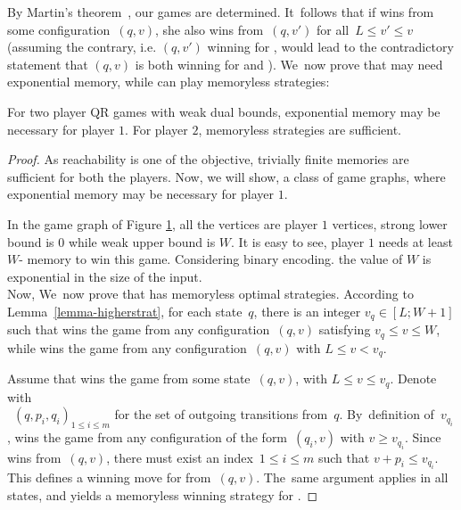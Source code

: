     By Martin's theorem~\cite{Mar75}, our games are determined. It~follows that if  wins from
    some configuration~$(q,v)$, she also wins from~$(q,v')$ for
    all~$L\leq v'\leq v$ (assuming the contrary, i.e. $(q,v')$ winning for , would lead to the contradictory statement that $(q,v)$ is both winning for  and ). We~now prove that  may need exponential memory, while  can play
    memoryless strategies:
    \vskip 0.5cm
    \begin{lemma}
    \label{mem-lemma}
    For two player QR games with weak dual bounds, exponential memory may be necessary for player $1$. For player $2$, memoryless strategies are sufficient.
    \end{lemma}
    \begin{proof}
    As reachability is one of the objective, trivially finite memories are sufficient for both the players. Now, we will show, a class of game graphs, where exponential memory may be necessary for player $1$.\\
    \begin{figure}[htb]
    \centering
    
    \label{expmem-p1}
    \end{figure}
    
    In the game graph of Figure \ref{expmem-p1}, all the vertices are player $1$  vertices, strong lower bound is $0$ while weak upper bound is $W$. It is easy to see, player $1$ needs at least $W$- memory to win this game. Considering binary encoding. the value of $W$ is exponential in the size of the input.\\
    \vskip 0.3cm
    Now, We~now prove that  has memoryless optimal strategies. According
      to Lemma~\ref{lemma-higherstrat}, for each state~$q$, there is an
      integer $v_q\in[L;W+1]$ such that  wins the game from any
      configuration~$(q,v)$ satisfying $v_q\leq v\leq W$, while  wins
      the game from any configuration~$(q,v)$ with $L\leq v<v_q$.
    
      Assume that  wins the game from some state~$(q,v)$, with $L\leq
      v\leq v_q$. Denote with\\~$(q,p_i,q_i)_{1\leq i\leq m}$ for the set of
      outgoing transitions from~$q$. By~definition of~$v_{q_i}$,  wins
      the game from any configuration of the form~$(q_i,v)$ with $v\geq
      v_{q_i}$. Since  wins from~$(q,v)$, there must exist an
      index~$1\leq i\leq m$ such that $v+p_i\leq v_{q_i}$. This defines a
      winning move for  from~$(q,v)$. The~same argument applies in all
      states, and yields a memoryless winning strategy for .
    \end{proof}
    \vskip 0.2cm
    
